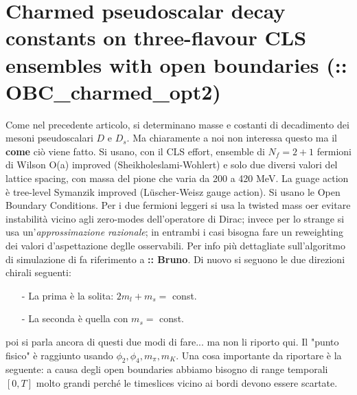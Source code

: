 \documentclass[12pt,a4paper,openright]{article}
\newcommand{\colg}{\textcolor{PineGreen}}
\newcommand{\obc}{Open Boundary Conditions}
\begin{document}
\section{Charmed pseudoscalar decay constants on three-flavour CLS ensembles with open boundaries (:: OBC\_charmed\_opt2)}
Come nel precedente articolo, si determinano masse e costanti di decadimento dei mesoni pseudoscalari $D$ e $D_s$.
Ma chiaramente a noi non interessa questo ma il {\bf come} ciò viene fatto.
\newline
Si usano, con il CLS effort, ensemble di $N_f = 2+1$ fermioni di Wilson O(a) improved (Sheikholeslami-Wohlert) e solo due diversi valori del lattice spacing, con massa del pione che varia da 200 a 420 MeV.
La guage action è tree-level Symanzik improved (Lüscher-Weisz gauge action).
Si usano le \colg{\obc}.
Per i due fermioni leggeri si usa la twisted mass oer evitare instabilità vicino agli zero-modes dell'operatore di Dirac; invece per lo strange si usa un'{\it approssimazione razionale};
in entrambi i casi bisogna fare un reweighting dei valori d'aspettazione deglle osservabili.
Per info più dettagliate sull'algoritmo di simulazione di fa riferimento a {\bf :: Bruno}.
Di nuovo si seguono le due direzioni chirali seguenti:
\begin{itemize}
  \item [-] La prima è la solita: $2m_l + m_s =$ const.
  \item [-] La seconda è quella con $m_s =$ const.
\end{itemize}
poi si parla ancora di questi due modi di fare... ma non li riporto qui. Il "punto fisico" è raggiunto usando $\phi_2, \phi_4, m_\pi, m_K$.
\newline
Una cosa importante da riportare è la seguente: a causa degli open boundaries abbiamo bisogno di range temporali $[0,T]$ molto grandi perché le timeslices vicino ai bordi devono essere scartate.
\end{document}
